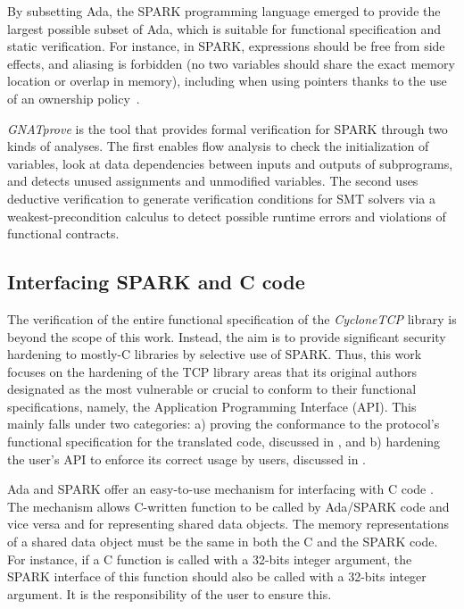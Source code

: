 \documentclass[conference]{IEEEtran}
\begin{document}
By subsetting Ada, the SPARK programming language \cite{mccormick_chapin_2015} emerged to provide the largest possible subset of Ada, which is suitable for functional specification and static verification. For instance, in SPARK, expressions should be free from side effects, and aliasing is forbidden (no two variables should share the exact memory location or overlap in memory), including when using pointers thanks to the use of an ownership policy~\cite{dross2020recursive}.

\emph{GNATprove} \cite{GNATProve:users_manual} is the tool that provides formal verification for SPARK through two kinds of analyses. The first enables flow analysis to check the initialization of variables, look at data dependencies between inputs and outputs of subprograms, and detects unused assignments and unmodified variables. The second uses deductive verification to generate verification conditions for SMT solvers via a weakest-precondition calculus to detect possible runtime errors and violations of functional contracts.



\subsection{Interfacing SPARK and C code}

The verification of the entire functional specification of the \emph{CycloneTCP} library is beyond the scope of this work. Instead, the aim is to provide significant security hardening to mostly-C libraries by selective use of SPARK. Thus, this work focuses on the hardening of the TCP library areas that its original authors designated as the most vulnerable or crucial to conform to their functional specifications, namely, the Application Programming Interface (API). This mainly falls under two categories: a) proving the conformance to the protocol's functional specification for the translated code, discussed in , and b) hardening the user's API to enforce its correct usage by users, discussed in .

Ada and SPARK offer an easy-to-use mechanism for interfacing with C code \cite{}. The mechanism allows C-written function to be called by Ada/SPARK code and vice versa and for representing shared data objects. The memory representations of a shared data object must be the same in both the C and the SPARK code. For instance, if a C function is called with a 32-bits integer argument, the SPARK interface of this function should also be called with a 32-bits integer argument. It is the responsibility of the user to ensure this.
\end{document}
